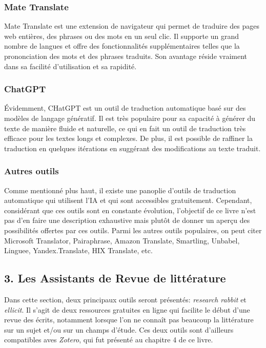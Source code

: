\documentclass[
  letterpaper,
  DIV=11,
  numbers=noendperiod]{scrreprt}
\begin{document}
\subsubsection{Mate Translate}\label{mate-translate}

Mate Translate est une extension de navigateur qui permet de traduire
des pages web entières, des phrases ou des mots en un seul clic. Il
supporte un grand nombre de langues et offre des fonctionnalités
supplémentaires telles que la prononciation des mots et des phrases
traduits. Son avantage réside vraiment dans sa facilité d'utilisation et
sa rapidité.

\subsubsection{ChatGPT}\label{chatgpt}

Évidemment, CHatGPT est un outil de traduction automatique basé sur des
modèles de langage génératif. Il est très populaire pour sa capacité à
générer du texte de manière fluide et naturelle, ce qui en fait un outil
de traduction très efficace pour les textes longs et complexes. De plus,
il est possible de raffiner la traduction en quelques itérations en
suggérant des modifications au texte traduit.

\subsubsection{Autres outils}\label{autres-outils}

Comme mentionné plus haut, il existe une panoplie d'outils de traduction
automatique qui utilisent l'IA et qui sont accessibles gratuitement.
Cependant, considérant que ces outils sont en constante évolution,
l'objectif de ce livre n'est pas d'en faire une description exhaustive
mais plutôt de donner un aperçu des possibilités offertes par ces
outils. Parmi les autres outils populaires, on peut citer Microsoft
Translator, Pairaphrase, Amazon Translate, Smartling, Unbabel, Linguee,
Yandex.Translate, HIX Translate, etc.

\subsection{3. Les Assistants de Revue de
littérature}\label{les-assistants-de-revue-de-littuxe9rature}

Dans cette section, deux principaux outils seront présentés:
\emph{research rabbit} et \emph{ellicit}. Il s'agit de deux ressources
gratuites en ligne qui facilite le début d'une revue des écrits,
notamment lorsque l'on ne connaît pas beaucoup la littérature sur un
sujet et/ou sur un champs d'étude. Ces deux outils sont d'ailleurs
compatibles aves \emph{Zotero}, qui fut présenté au chapitre 4 de ce
livre.
\end{document}
